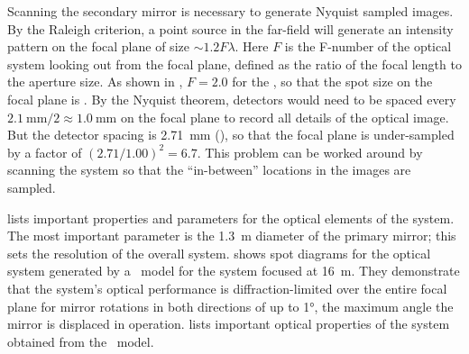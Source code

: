 Scanning the secondary mirror is necessary to generate Nyquist sampled images.
By the Raleigh criterion, a point source in the far-field will generate an intensity pattern on the focal plane of size $\sim 1.2 F \lambda$.
Here $F$ is the F-number of the optical system looking out from the focal plane, defined as the ratio of the focal length to the aperture size.
As shown in , $F = 2.0$ for the \Imager, so that the spot size on the focal plane is .
By the Nyquist theorem, detectors would need to be spaced every $ \SI{2.1}{\mm} / 2 \approx \SI{1.0}{\mm}$ on the focal plane to record all details of the optical image.
But the detector spacing is \SI{2.71}{\mm} (), so that the focal plane is under-sampled by a factor of $ (2.71/1.00)^2 = 6.7$.
This problem can be worked around by scanning the system so that the ``in-between'' locations in the images are sampled. 

 lists important properties and parameters for the optical elements of the system.
The most important parameter is the \SI{1.3}{\m} diameter of the primary mirror; this sets the resolution of the overall system.
 shows spot diagrams for the optical system generated by a \ZEMAX\ model for the system focused at \SI{16}{\m}.
They demonstrate that the system's optical performance is diffraction-limited over the entire focal plane for mirror rotations in both directions of up to \ang{1}, the maximum angle the mirror is displaced in operation.
 lists important optical properties of the system obtained from the \ZEMAX\ model.

